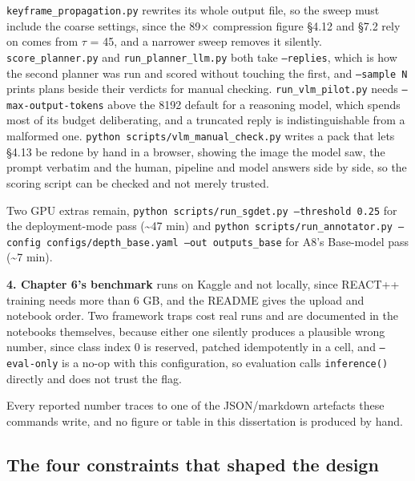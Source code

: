 \texttt{keyframe\_\allowbreak{}propagation.py} rewrites its whole output file, so the sweep must include the coarse settings, since the 89$\times$ compression figure \S{}4.12 and \S{}7.2 rely on comes from $\tau$ = 45, and a narrower sweep removes it silently. \texttt{score\_\allowbreak{}planner.py} and \texttt{run\_\allowbreak{}planner\_\allowbreak{}llm.py} both take \texttt{--replies}, which is how the second planner was run and scored without touching the first, and \texttt{--sample N} prints plans beside their verdicts for manual checking. \texttt{run\_\allowbreak{}vlm\_\allowbreak{}pilot.py} needs \texttt{--max-output-tokens} above the 8192 default for a reasoning model, which spends most of its budget deliberating, and a truncated reply is indistinguishable from a malformed one. \texttt{python scripts/vlm\_\allowbreak{}manual\_\allowbreak{}check.py} writes a pack that lets \S{}4.13 be redone by hand in a browser, showing the image the model saw, the prompt verbatim and the human, pipeline and model answers side by side, so the scoring script can be checked and not merely trusted.

Two GPU extras remain, \texttt{python scripts/run\_\allowbreak{}sgdet.py --threshold 0.25} for the deployment-mode pass (\textasciitilde{}47 min) and \texttt{python scripts/run\_\allowbreak{}annotator.py --config configs/depth\_\allowbreak{}base.yaml --out outputs\_\allowbreak{}base} for A8's Base-model pass (\textasciitilde{}7 min).

\textbf{4. Chapter 6's benchmark} runs on Kaggle and not locally, since REACT++ training needs more than 6 GB, and the README gives the upload and notebook order. Two framework traps cost real runs and are documented in the notebooks themselves, because either one silently produces a plausible wrong number, since class index 0 is reserved, patched idempotently in a cell, and \texttt{--eval-only} is a no-op with this configuration, so evaluation calls \texttt{inference()} directly and does not trust the flag.

Every reported number traces to one of the JSON/markdown artefacts these commands write, and no figure or table in this dissertation is produced by hand.

\subsection{The four constraints that shaped the design}

